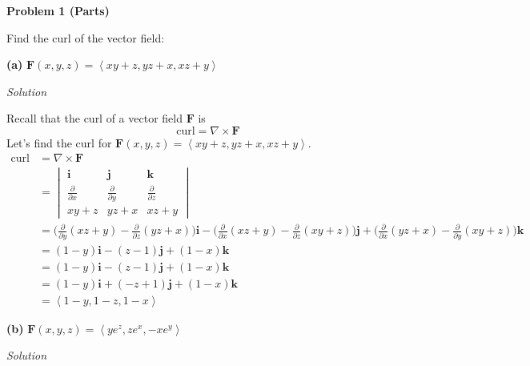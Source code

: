 \documentclass{article}
\newcommand{\lrp}[1]{\left( #1 \right)}
\newcommand{\lra}[1]{\left\langle #1 \right\rangle}
\renewcommand{\i}[0]{\mathbf{i}}
\renewcommand{\j}[0]{\mathbf{j}}
\renewcommand{\k}[0]{\mathbf{k}}
\newcommand{\F}[0]{\mathbf{F}}
\newcommand{\Solution}{\textit{Solution}}
\begin{document}
{}\textbf{Problem 1 (Parts)}

Find the curl of the vector field:

{}\textbf{(a)} $\F(x,y,z)=\lra{xy+z,yz+x,xz+y}$

\Solution

Recall that the curl of a vector field $\F$ is
\begin{equation*}
    \text{curl}=\nabla \times \F
\end{equation*}
Let's find the curl for $\F(x,y,z)=\lra{xy+z,yz+x,xz+y}$.
\begin{align*}
    \text{curl}&=\nabla \times \F \\
    &=\begin{vmatrix}
    \i & \j & \k \\
    \frac{\partial }{\partial x} &  \frac{\partial }{\partial y} &
     \frac{\partial }{\partial z}\\
     xy+z & yz+x& xz+y
    \end{vmatrix}\\
    &=\Bigg(\frac{\partial }{\partial y}(xz+y)-\frac{\partial }{\partial z}(yz+x)\Bigg)\i-\Bigg(\frac{\partial}{\partial x}(xz+y)-\frac{\partial}{\partial z}(xy+z)\Bigg)\j+\Bigg(\frac{\partial}{\partial x}(yz+x)-\frac{\partial}{\partial y}(xy+z)\Bigg)\k\\
    &=\lrp{1-y}\i-\lrp{z-1}\j+\lrp{1-x}\k\\
    &=\lrp{1-y}\i-\lrp{z-1}\j+\lrp{1-x}\k\\
    &=\lrp{1-y}\i+\lrp{-z+1}\j+\lrp{1-x}\k\\
    &=\boxed{\lra{1-y,1-z,1-x}}
\end{align*}

{}\textbf{(b)} $\F(x,y,z)=\lra{ye^z,ze^x,-xe^y}$

\Solution
\end{document}
